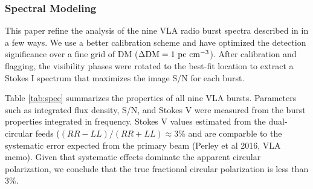 \documentclass[twocolumn]{aastex61}
\begin{document}
\subsubsection{Spectral Modeling}
\label{sec:spec}
This paper refine the analysis of the nine VLA radio burst spectra described in \citet{LOC} in a few ways. We use a better calibration scheme and have optimized the detection significance over a fine grid of DM ($\Delta \rm{DM}=1\ \rm{pc}\ \rm{cm}^{-3}$). After calibration and flagging, the visibility phases were rotated to the best-fit location \citep[(RA, Dec) $=$ (05h31m58.70s, +33d08m52.5s);][]{LOC} to extract a Stokes I spectrum that maximizes the image S/N for each burst.

Table \ref{tab:spec} summarizes the properties of all nine VLA bursts. Parameters such as integrated flux density, S/N, and Stokes V were measured from the burst properties integrated in frequency. Stokes V values estimated from the dual-circular feeds ($(RR-LL)/(RR+LL)\approx3\%$ and are comparble to the systematic error expected from the primary beam (Perley et al 2016, VLA memo). Given that systematic effects dominate the apparent circular polarization, we conclude that the true fractional circular polarization is less than 3\%.
\end{document}
